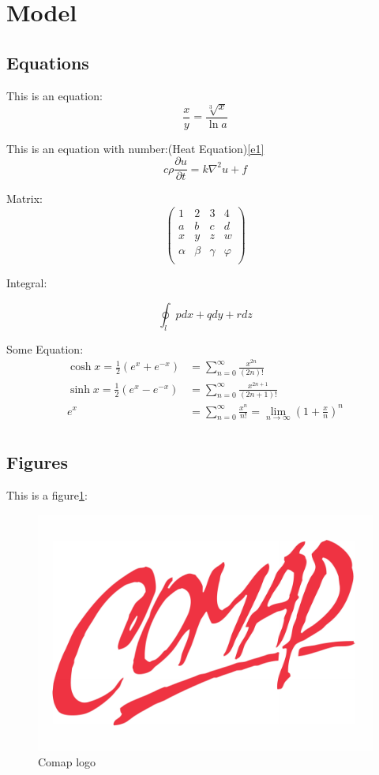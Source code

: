 \section{Model}
\lipsum[1-4]

\subsection{Equations}

This is an equation:$$\frac{x}{y}=\frac{\sqrt[3]{x}}{\ln a}$$

This is an equation with number:(Heat Equation)\ref{e1}
\begin{equation}\label{e1}
	c\rho\frac{\partial u}{\partial t}=k\nabla^2u+f
\end{equation}

Matrix:
$$
\left( \begin{matrix}
1&		2&		3&		4\\
a&		b&		c&		d\\
x&		y&		z&		w\\
\alpha&		\beta&		\gamma&		\varphi\\
\end{matrix} \right) 
$$

Integral:

$$
\oint_l{pdx+qdy+rdz}
$$

Some Equation:
\begin{align*}
\cosh x = \frac {1}{2} (e^x + e^{-x}) &= \sum_{n = 0}^{\infty} \frac {x^{2n}}{(2n)!} \\
\sinh x = \frac {1}{2} (e^x - e^{-x}) &= \sum_{n = 0}^{\infty} \frac {x^{2n + 1}}{(2n + 1)!} \\
e^x &= \sum_{n = 0}^{\infty} \frac {x^n}{n!} = \lim_{n\to\infty} \left (1+\frac{x}{n} \right )^n\\
\end{align*}

\subsection{Figures}
This is a figure\ref{fig:comap-logo}:
\begin{figure}[h]
	\centering
	\includegraphics[width=0.7\linewidth]{"figure/comap logo"}
	\caption{Comap logo}
	\label{fig:comap-logo}
\end{figure}
